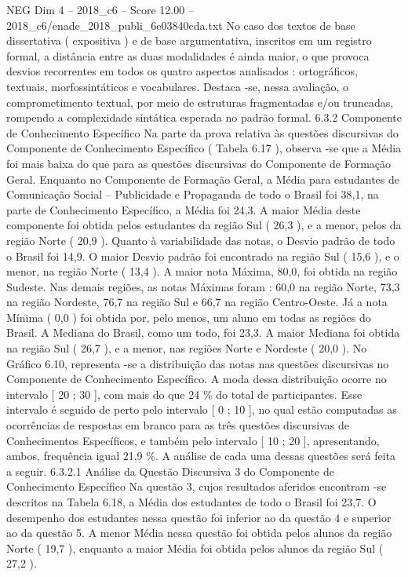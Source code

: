 \begin{textsample}{NEG Dim 4 – 2018\_c6 – Score 12.00 – 2018\_c6/enade\_2018\_publi\_6e03840cda.txt}
No caso dos textos de base dissertativa ( expositiva ) e de base argumentativa, inscritos em um registro formal, a distância entre as duas modalidades é ainda maior, o que provoca desvios recorrentes em todos os quatro aspectos analisados : ortográficos, textuais, morfossintáticos e vocabulares.
Destaca -se, nessa avaliação, o comprometimento textual, por meio de estruturas fragmentadas e/ou truncadas, rompendo a complexidade sintática esperada no padrão formal. 6.3.2 Componente de Conhecimento Específico Na parte da prova relativa às questões discursivas do Componente de Conhecimento Específico ( Tabela 6.17 ), observa -se que a Média foi mais baixa do que para as questões discursivas do Componente de Formação Geral.
Enquanto no Componente de Formação Geral, a Média para estudantes de Comunicação Social – Publicidade e Propaganda de todo o Brasil foi 38,1, na parte de Conhecimento Específico, a Média foi 24,3.
A maior Média deste componente foi obtida pelos estudantes da região Sul ( 26,3 ), e a menor, pelos da região Norte ( 20,9 ).
Quanto à variabilidade das notas, o Desvio padrão de todo o Brasil foi 14,9.
O maior Desvio padrão foi encontrado na região Sul ( 15,6 ), e o menor, na região Norte ( 13,4 ).
A maior nota Máxima, 80,0, foi obtida na região Sudeste.
Nas demais regiões, as notas Máximas foram : 60,0 na região Norte, 73,3 na região Nordeste, 76,7 na região Sul e 66,7 na região Centro-Oeste.
Já a nota Mínima ( 0,0 ) foi obtida por, pelo menos, um aluno em todas as regiões do Brasil.
A Mediana do Brasil, como um todo, foi 23,3.
A maior Mediana foi obtida na região Sul ( 26,7 ), e a menor, nas regiões Norte e Nordeste ( 20,0 ).
No Gráfico 6.10, representa -se a distribuição das notas nas questões discursivas no Componente de Conhecimento Específico.
A moda dessa distribuição ocorre no intervalo [ 20 ; 30 ], com mais do que 24 \% do total de participantes.
Esse intervalo é seguido de perto pelo intervalo [ 0 ; 10 ], no qual estão computadas as ocorrências de respostas em branco para as três questões discursivas de Conhecimentos Específicos, e também pelo intervalo [ 10 ; 20 ], apresentando, ambos, frequência igual 21,9 \%.
A análise de cada uma dessas questões será feita a seguir. 6.3.2.1 Análise da Questão Discursiva 3 do Componente de Conhecimento Específico Na questão 3, cujos resultados aferidos encontram -se descritos na Tabela 6.18, a Média dos estudantes de todo o Brasil foi 23,7.
O desempenho dos estudantes nessa questão foi inferior ao da questão 4 e superior ao da questão 5.
A menor Média nessa questão foi obtida pelos alunos da região Norte ( 19,7 ), enquanto a maior Média foi obtida pelos alunos da região Sul ( 27,2 ).

\end{textsample}
